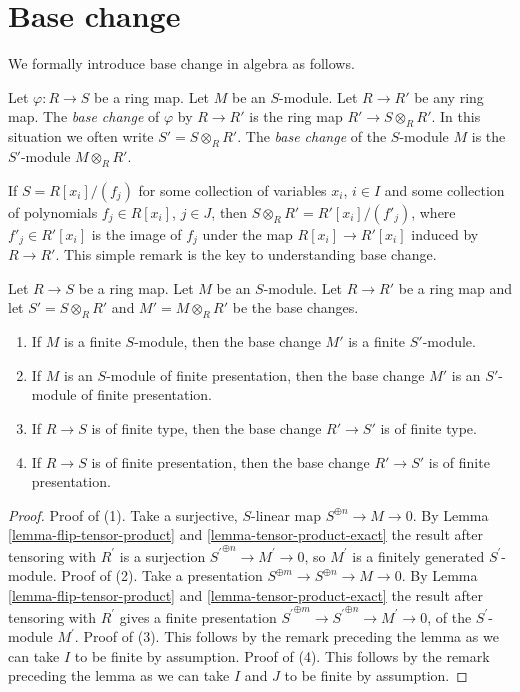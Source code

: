 \section{Base change}
\label{section-base-change}

\noindent
We formally introduce base change in algebra as follows.

\begin{definition}
\label{definition-base-change}
Let $\varphi : R \to S$ be a ring map. Let $M$ be an $S$-module.
Let $R \to R'$ be any ring map. The {\it base change} of $\varphi$
by $R \to R'$ is the ring map $R' \to S \otimes_R R'$. In this situation
we often write $S' = S \otimes_R R'$.
The {\it base change} of the $S$-module $M$ is the $S'$-module
$M \otimes_R R'$.
\end{definition}

\noindent
If $S = R[x_i]/(f_j)$ for some collection of variables $x_i$, $i \in I$
and some collection of polynomials $f_j \in R[x_i]$, $j \in J$, then
$S \otimes_R R' = R'[x_i]/(f'_j)$, where $f'_j \in R'[x_i]$ is the image
of $f_j$ under the map $R[x_i] \to R'[x_i]$ induced by $R \to R'$.
This simple remark is the key to understanding base change.

\begin{lemma}
\label{lemma-base-change-finiteness}
Let $R \to S$ be a ring map. Let $M$ be an $S$-module.
Let $R \to R'$ be a ring map and let $S' = S \otimes_R R'$ and
$M' = M \otimes_R R'$ be the base changes.
\begin{enumerate}
\item If $M$ is a finite $S$-module, then the base change
$M'$ is a finite $S'$-module.
\item If $M$ is an $S$-module of finite presentation, then
the base change $M'$ is an $S'$-module of finite presentation.
\item If $R \to S$ is of finite type, then the base change
$R' \to S'$ is of finite type.
\item If $R \to S$ is of finite presentation, then
the base change $R' \to S'$ is of finite presentation.
\end{enumerate}
\end{lemma}

\begin{proof}
Proof of (1). Take a surjective, $S$-linear map
$S^{\oplus n} \to M \to 0$.
By Lemma \ref{lemma-flip-tensor-product} and \ref{lemma-tensor-product-exact}
the result after tensoring with $R^\prime$ is a surjection
${S^\prime}^{\oplus n} \to M^\prime \rightarrow 0$,
so $M^\prime$ is a finitely generated $S^\prime$-module.
Proof of (2). Take a presentation
$S^{\oplus m} \to S^{\oplus n} \to M \to 0$.
By Lemma \ref{lemma-flip-tensor-product} and \ref{lemma-tensor-product-exact}
the result after tensoring with $R^\prime$ gives a finite presentation
${S^\prime}^{\oplus m} \to {S^\prime}^{\oplus n} \to M^\prime \to 0$, of
the $S^\prime$-module $M^\prime$. Proof of (3). This follows by the remark
preceding the lemma as we can take $I$ to be finite by assumption.
Proof of (4). This follows by the remark preceding the lemma
as we can take $I$ and $J$ to be finite by assumption.
\end{proof}

